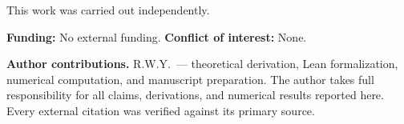 \documentclass[aps,prd,preprint,superscriptaddress,nofootinbib,amsmath,amssymb,floatfix]{revtex4-2}
\begin{document}
\begin{acknowledgments}
This work was carried out independently.

\textbf{Funding:} No external funding. \textbf{Conflict of interest:} None.

\textbf{Author contributions.} R.W.Y.\ --- theoretical derivation, Lean formalization, numerical computation, and manuscript preparation. The author takes full responsibility for all claims, derivations, and numerical results reported here. Every external citation was verified against its primary source.
\end{acknowledgments}




\newpage
\appendix

\end{document}
